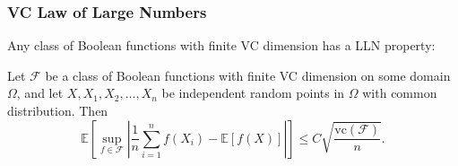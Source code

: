 \subsubsection{VC Law of Large Numbers}
Any class of Boolean functions with finite VC dimension has a LLN property: 

\begin{theorem}
\label{thm:8.3.15}
Let $\mathcal{F}$ be a class of Boolean functions with finite VC dimension on some domain $\Omega$, and let 
$X, X_1, X_2, \dots, X_n$ be independent random points in $\Omega$ with common distribution. Then 
\[ \mathbb{E}\left[ \sup_{f \in \mathcal{F}} \left| \frac{1}{n}\sum_{i = 1}^{n} f(X_i) - \mathbb{E}\left[ f(X) 
\right] \right| \right] \leq C \sqrt{\frac{\mathrm{vc}(\mathcal{F})}{n}}. \]
\end{theorem}

